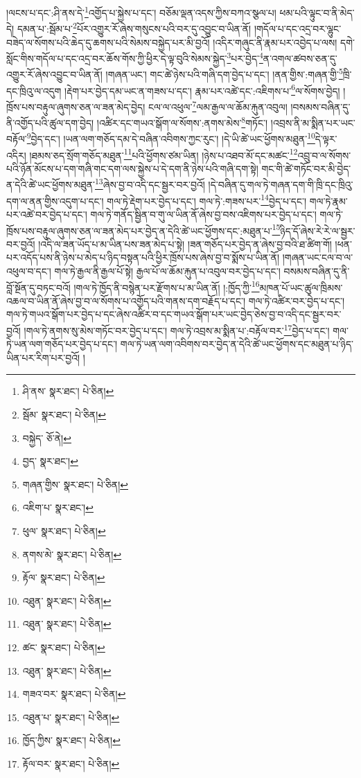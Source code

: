 །ལངས་པ་དང་:ཤི་ནས་དེ་\footnote{ཤི་ནས་  སྣར་ཐང་།  པེ་ཅིན། }འགྱོད་པ་སྐྱེས་པ་དང་། བཅོམ་ལྡན་འདས་ཀྱིས་བཀའ་སྩལ་པ། ཕམ་པའི་ལྟུང་བ་ནི་མེད་དེ། དམན་པ་:སྦོམ་པ་\footnote{སྦོམ་  སྣར་ཐང་།  པེ་ཅིན། }པོར་འགྱུར་རོ་ཞེས་གསུངས་པའི་བར་དུ་འབྱུང་བ་ཡིན་ནོ། །གདོལ་པ་དང་འདྲ་བར་ལྷུང་བཟེད་ལ་སོགས་པའི་ཆེད་དུ་ཆགས་པའི་སེམས་བསྐྱེད་པར་མི་བྱའོ། །འདིར་གཞུང་ནི་རྣམ་པར་འབྱེད་པ་ལས། དགེ་སློང་གིས་གདོལ་པ་དང་འདྲ་བར་ཆོས་གོས་ཀྱི་ཕྱིར་དེ་ལྟ་བུའི་སེམས་སྐྱེད་\footnote{བསྐྱེད་  ཅོ་ནེ། }པར་བྱེད་\footnote{བྱད་  སྣར་ཐང་། }ན་འགལ་ཚབས་ཅན་དུ་འགྱུར་རོ་ཞེས་འབྱུང་བ་ཡིན་ནོ། །གཞན་ཡང་། གང་ཚེ་ཉེས་པའི་གཞི་དག་བྱེད་པ་དང་། །ནན་གྱིས་:གཞན་གྱི་\footnote{གཞན་གྱིས་  སྣར་ཐང་།  པེ་ཅིན། }ཁྲི་དང་ཁྲིའུ་ལ་འདུག །རྡེག་པར་བྱེད་དམ་ཡང་ན་གཟས་པ་དང་། རྣམ་པར་འཚེ་དང་:འཇིགས་པ་\footnote{འཇིག་པ་  སྣར་ཐང་། }ལ་སོགས་བྱེད། །ཁྲོས་པས་བརྟུལ་ཞུགས་ཅན་ལ་ཟན་མེད་བྱེད། ངལ་ལ་འཕུལ་\footnote{ཕུལ་  སྣར་ཐང་།  པེ་ཅིན། }ལམ་རྒྱལ་ལ་ཆོམ་རྐུན་འབུལ། །བསམས་བཞིན་དུ་ནི་འགྱོད་པའི་ཚུལ་དག་བྱེད། །འཚིར་དང་གཡའ་སྒོག་ལ་སོགས་:ནགས་མེས་\footnote{ནགས་མེ་  སྣར་ཐང་།  པེ་ཅིན། }གཏོང་། །འབྲས་ནི་མ་སྨིན་པར་ཡང་བརྟོལ་\footnote{རྟོལ་  སྣར་ཐང་།  པེ་ཅིན། }བྱེད་དང་། །ཡན་ལག་གཅོད་དམ་དེ་བཞིན་འབིགས་ཀྱང་རུང་། །དེ་ཡི་ཚེ་ཡང་ཕྱོགས་མཐུན་\footnote{འཐུན་  སྣར་ཐང་།  པེ་ཅིན། }དེ་ལྟར་འདིར། །ཐམས་ཅད་སྲོག་གཅོད་མཐུན་\footnote{འཐུན་  སྣར་ཐང་།  པེ་ཅིན། }པའི་ཕྱོགས་ཙམ་ཡིན། །ཉེས་པ་འཐབ་མོ་དང་མཚང་\footnote{ཚང་  སྣར་ཐང་།  པེ་ཅིན། }འབྲུ་བ་ལ་སོགས་པའི་ཉོན་མོངས་པ་དག་གཞི་གང་དག་ལས་སྐྱེས་པ་དེ་དག་ནི་ཉེས་པའི་གཞི་དག་སྟེ། གང་གི་ཚེ་གཏོང་བར་མི་བྱེད་ན་དེའི་ཚེ་ཡང་ཕྱོགས་མཐུན་\footnote{འཐུན་  སྣར་ཐང་།  པེ་ཅིན། }ཞེས་བྱ་བ་འདི་དང་སྦྱར་བར་བྱའོ། །དེ་བཞིན་དུ་གལ་ཏེ་གཞན་དག་གི་ཁྲི་དང་ཁྲིའུ་དག་ལ་ནན་གྱིས་འདུག་པ་དང་། གལ་ཏེ་རྡེག་པར་བྱེད་པ་དང་། གལ་ཏེ་:གཟས་པར་\footnote{གཟའ་བར་  སྣར་ཐང་།  པེ་ཅིན། }བྱེད་པ་དང་། གལ་ཏེ་རྣམ་པར་འཚེ་བར་བྱེད་པ་དང་། གལ་ཏེ་གནོད་སྦྱིན་བ་གུ་ལ་ཡིན་ནོ་ཞེས་བྱ་བས་འཇིགས་པར་བྱེད་པ་དང་། གལ་ཏེ་ཁྲོས་པས་བརྟུལ་ཞུགས་ཅན་ལ་ཟན་མེད་པར་བྱེད་ན་དེའི་ཚེ་ཡང་ཕྱོགས་དང་:མཐུན་པ་\footnote{འཐུན་པ་  སྣར་ཐང་།  པེ་ཅིན། }ཉིད་དོ་ཞེས་རེ་རེ་ལ་སྦྱར་བར་བྱའོ། །འདི་ལ་ཟན་ཡོད་པ་མ་ཡིན་པས་ཟན་མེད་པ་སྟེ། །ཟན་གཅོད་པར་བྱེད་ན་ཞེས་བྱ་བའི་ཐ་ཚིག་གོ། །ཕན་པར་འདོད་པས་ནི་ཉེས་པ་མེད་པ་ཉིད་བསྟན་པའི་ཕྱིར་ཁྲོས་པས་ཞེས་བྱ་བ་སྨོས་པ་ཡིན་ནོ། །གཞན་ཡང་ངལ་བ་ལ་འཕུལ་བ་དང་། གལ་ཏེ་རྒྱལ་ནི་རྒྱལ་པོ་སྟེ། རྒྱལ་པོ་ལ་ཆོམ་རྐུན་པ་འབུལ་བར་བྱེད་པ་དང་། བསམས་བཞིན་དུ་ནི་བློ་སྔོན་དུ་བཏང་བའོ། །གལ་ཏེ་ཁྱོད་ནི་བསྙེན་པར་རྫོགས་པ་མ་ཡིན་ནོ། །:ཁྱོད་ཀྱི་\footnote{ཁྱོད་ཀྱིས་  སྣར་ཐང་།  པེ་ཅིན། }མཁན་པོ་ཡང་ཚུལ་ཁྲིམས་འཆལ་བ་ཡིན་ནོ་ཞེས་བྱ་བ་ལ་སོགས་པ་འགྱོད་པའི་གནས་དག་བརྗོད་པ་དང་། གལ་ཏེ་འཚིར་བར་བྱེད་པ་དང་། གལ་ཏེ་གཡའ་སྒོག་པར་བྱེད་པ་དང་ཞེས་འཚིར་བ་དང་གཡའ་སྒོག་པར་ཡང་བྱེད་ཅེས་བྱ་བ་འདི་དང་སྦྱར་བར་བྱའོ། །གལ་ཏེ་ནགས་སུ་མེས་གཏོང་བར་བྱེད་པ་དང་། གལ་ཏེ་འབྲས་མ་སྨིན་པ་:བརྟོལ་བར་\footnote{རྟོལ་བར་  སྣར་ཐང་།  པེ་ཅིན། }བྱེད་པ་དང་། གལ་ཏེ་ཡན་ལག་གཅོད་པར་བྱེད་པ་དང་། གལ་ཏེ་ཡན་ལག་འབིགས་བར་བྱེད་ན་དེའི་ཚེ་ཡང་ཕྱོགས་དང་མཐུན་པ་ཉིད་ཡིན་པར་རིག་པར་བྱའོ། །
